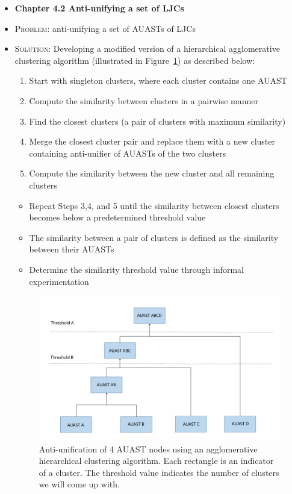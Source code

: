 \documentclass{article}
\newcommand{\bold}{\textbf}
\newcommand{\tsc}{\textsc}
\begin{document}
\begin{itemize} [leftmargin=.1in]
\item \bold{Chapter 4.2 Anti-unifying a set of LJCs}
\item \tsc{Problem: } anti-unifying a set of AUASTs of LJCs
\item \tsc{Solution: }Developing a modified version of a hierarchical agglomerative clustering algorithm (illustrated in Figure~\ref{fig:overview2}) as described below: 
\begin{enumerate}
\item Start with singleton clusters, where each cluster contains one AUAST 
\item Compute the similarity between clusters in a pairwise manner 
\item Find the closest clusters (a pair of clusters with maximum  similarity)
\item Merge the closest cluster pair and replace them with a new cluster containing anti-unifier of AUASTs of the two clusters 
\item Compute the similarity between the new cluster and all remaining clusters 
\end{enumerate}
\begin{itemize}
\item Repeat Steps 3,4, and 5 until the similarity between closest clusters becomes below a predetermined threshold value
\item The similarity between a pair of clusters is defined as the similarity between their AUASTs 
\item Determine the similarity threshold value through informal experimentation 
\end{itemize}
\begin{figure} [H]
  \centering\includegraphics [width = \textwidth]{Drawing4/overview2.pdf}
  \caption{Anti-unification of 4 AUAST nodes using an agglomerative hierarchical clustering algorithm. Each rectangle is an indicator of a cluster. The threshold value indicates the number of clusters we will come up with.}
  \label{fig:overview2}
\end{figure}


\end{itemize}
\end{document}
